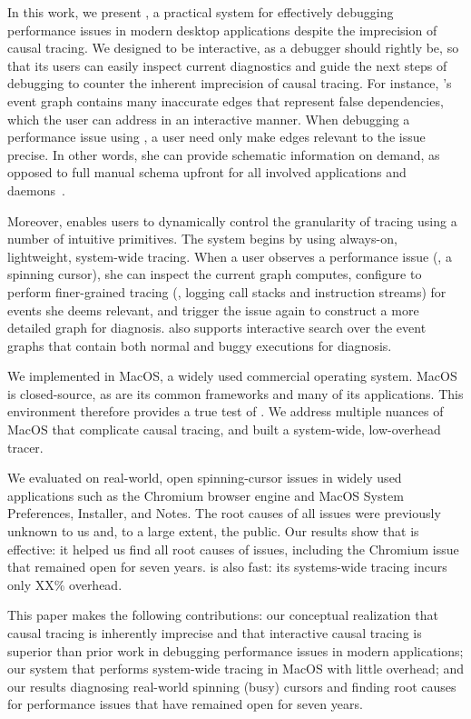 In this work, we present \xxx, a practical system for effectively debugging
performance issues in modern desktop applications despite the imprecision of
causal tracing.  We designed \xxx to be interactive, as a debugger should rightly be,
so that its users can easily inspect current diagnostics and guide the next
steps of debugging to counter the inherent imprecision of causal tracing. For
instance, \xxx's event graph contains many inaccurate edges that represent
false dependencies, which the user can address in an interactive manner.
When debugging a performance issue using \xxx, a user need only make edges
relevant to the issue precise.  In other words, she can provide schematic
information on demand, as opposed to full manual schema upfront for all
involved applications and daemons~\cite{magpie}.

Moreover, \xxx enables users to dynamically control the granularity of
tracing using a number of intuitive primitives. The system begins by using
always-on, lightweight, system-wide tracing.  When a user observes a
performance issue (\eg, a spinning cursor), she can inspect the current
graph \xxx computes, configure \xxx to perform finer-grained tracing (\eg,
logging call stacks and instruction streams) for events she deems
relevant, and trigger the issue again to construct a more detailed graph for diagnosis.  \xxx also
supports interactive search over the event graphs that contain both normal
and buggy executions for diagnosis.

We implemented \xxx in MacOS, a widely used commercial operating system. MacOS
is closed-source, as are its common frameworks and many of its applications.
This environment therefore provides a true test of \xxx.  We address multiple
nuances of MacOS that complicate causal tracing, and built a system-wide,
low-overhead tracer.

We evaluated \xxx on \nbug real-world, open spinning-cursor issues in
widely used applications such as the Chromium browser engine and MacOS
System Preferences, Installer, and Notes.  The root causes of all \nbug
issues were previously unknown to us and, to a large extent, the
public. Our results show that \xxx is effective: it helped us find all
root causes of issues, including the Chromium issue that remained open for
seven years.  \xxx is also fast: its systems-wide tracing incurs only XX\%
overhead.

This paper makes the following contributions: our conceptual realization
that causal tracing is inherently imprecise and that interactive causal
tracing is superior than prior work in debugging performance issues in
modern applications; our system \xxx that performs system-wide tracing in
MacOS with little overhead; and our results diagnosing real-world spinning (busy)
cursors and finding root causes for performance issues that have remained open
for seven years.

